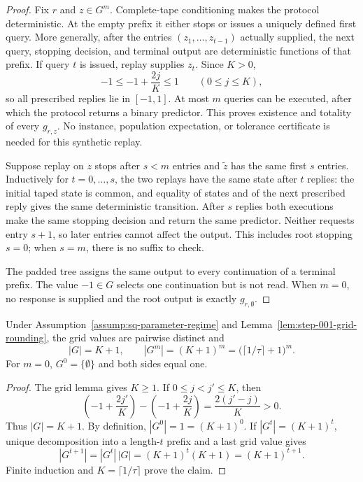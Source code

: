 \begin{proof}
Fix \(r\) and \(z\in G^m\).  Complete-tape conditioning makes the protocol
deterministic.  At the empty prefix it either stops or issues a uniquely
defined first query.  More generally, after the entries
\((z_1,\ldots,z_{t-1})\) actually supplied, the next query, stopping
decision, and terminal output are deterministic functions of that prefix.
If query \(t\) is issued, replay supplies \(z_t\).  Since \(K>0\),
\[
-1\le -1+\frac{2j}{K}\le1
\qquad(0\le j\le K),
\]
so all prescribed replies lie in \([-1,1]\).  At most \(m\) queries can be
executed, after which the protocol returns a binary predictor.  This proves
existence and totality of every \(g_{r,z}\).  No instance, population
expectation, or tolerance certificate is needed for this synthetic replay.

Suppose replay on \(z\) stops after \(s<m\) entries and \(\widetilde z\)
has the same first \(s\) entries.  Inductively for \(t=0,\ldots,s\), the
two replays have the same state after \(t\) replies: the initial taped state
is common, and equality of states and of the next prescribed reply gives the
same deterministic transition.  After \(s\) replies both executions make
the same stopping decision and return the same predictor.  Neither requests
entry \(s+1\), so later entries cannot affect the output.  This includes
root stopping \(s=0\); when \(s=m\), there is no suffix to check.

The padded tree assigns the same output to every continuation of a terminal
prefix.  The value \(-1\in G\) selects one continuation but is not read.
When \(m=0\), no response is supplied and the root output is exactly
\(g_{r,\emptyset}\).
\end{proof}

\begin{lemma}
\label{lem:step-002-response-count}
Under Assumption~\ref{assump:sq-parameter-regime} and
Lemma~\ref{lem:step-001-grid-rounding}, the grid values are pairwise
distinct and
\[
|G|=K+1,
\qquad
|G^m|=(K+1)^m
=\bigl(\lceil1/\tau\rceil+1\bigr)^m.
\]
For \(m=0\), \(G^0=\{\emptyset\}\) and both sides equal one.
\end{lemma}

\begin{proof}
The grid lemma gives \(K\ge1\).  If \(0\le j<j'\le K\), then
\[
\left(-1+\frac{2j'}K\right)-\left(-1+\frac{2j}K\right)
=\frac{2(j'-j)}K>0.
\tag{A.7}\label{eq:grid-distinct}
\]
Thus \(|G|=K+1\).  By definition,
\(|G^0|=1=(K+1)^0\).  If \(|G^t|=(K+1)^t\), unique decomposition into a
length-\(t\) prefix and a last grid value gives
\[
|G^{t+1}|=|G^t|\,|G|=(K+1)^t(K+1)=(K+1)^{t+1}.
\tag{A.8}\label{eq:product-count-induction}
\]
Finite induction and \(K=\lceil1/\tau\rceil\) prove the claim.
\end{proof}

